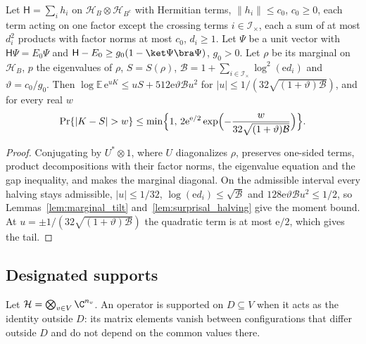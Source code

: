 \begin{theorem}
    \label{thm:marginal_tails}
    \leanok
    Let $\mathsf H=\sum_ih_i$ on $\mathcal H_B\otimes\mathcal H_{B^c}$ with
    Hermitian terms, $\lVert h_i\rVert\le c_0$, $c_0\ge0$, each term acting on one
    factor except the crossing terms $i\in\mathcal I_\times$, each a sum of
    at most $d_i^2$ products with factor norms at most $c_0$, $d_i\ge1$. Let
    $\Psi$ be a unit vector with $\mathsf H\Psi=E_0\Psi$ and
    $\mathsf H-E_0\ge g_0(1-\ket\Psi\bra\Psi)$, $g_0>0$. Let $\rho$ be its
    marginal on $\mathcal H_B$, $p$ the eigenvalues of $\rho$, $S=S(\rho)$,
    $\mathcal B=1+\sum_{i\in\mathcal I_\times}\log^2(\mathrm ed_i)$ and
    $\vartheta=c_0/g_0$. Then
    $\log\mathbb E\,\mathrm e^{uK}\le uS+512\mathrm e\vartheta\mathcal Bu^2$ for
    $|u|\le1/(32\sqrt{(1+\vartheta)\mathcal B})$, and for every real $w$
    \[
        \Pr\{|K-S|>w\}\le\min\Bigl\{1,\,2\mathrm e^{\mathrm e/2}
        \exp\Bigl(-\frac{w}{32\sqrt{(1+\vartheta)\mathcal B}}\Bigr)\Bigr\}.
    \]
\end{theorem}
\begin{proof}\leanok
    Conjugating by $U^*\otimes1$, where $U$ diagonalizes $\rho$, preserves
    one-sided terms, product decompositions with their factor norms, the
    eigenvalue equation and the gap inequality, and makes the marginal
    diagonal. On the admissible interval every halving stays admissible,
    $|u|\le1/32$, $\log(\mathrm ed_i)\le\sqrt{\mathcal B}$ and
    $128\mathrm e\vartheta\mathcal Bu^2\le1/2$, so
    Lemmas~\ref{lem:marginal_tilt} and~\ref{lem:surprisal_halving} give the
    moment bound. At $u=\pm1/(32\sqrt{(1+\vartheta)\mathcal B})$ the
    quadratic term is at most $\mathrm e/2$, which gives the tail.
\end{proof}

\subsection{Designated supports}
\label{sec:marginal_tails_supports}

Let $\mathcal H=\bigotimes_{v\in V}\C^{n_v}$. An operator is supported on
$D\subseteq V$ when it acts as the identity outside $D$: its matrix
elements vanish between configurations that differ outside $D$ and do not
depend on the common values there.

